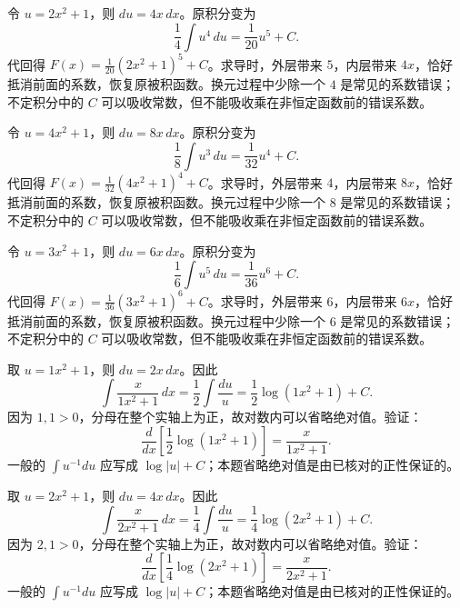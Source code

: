 \documentclass[UTF8,12pt,a4paper,fontset=fandol]{ctexart}
\begin{document}
\begin{solve}\label{ans:c12q4}
令 $u=2x^2+1$，则 $du=4x\,dx$。原积分变为
\[
\frac1{4}\int u^{4}\,du=\frac{1}{20}u^{5}+C.
\]
代回得 $F(x)=\frac{1}{20}(2x^2+1)^{5}+C$。求导时，外层带来 $5$，内层带来 $4x$，恰好抵消前面的系数，恢复原被积函数。换元过程中少除一个 $4$ 是常见的系数错误；不定积分中的 $C$ 可以吸收常数，但不能吸收乘在非恒定函数前的错误系数。
\end{solve}

\begin{solve}\label{ans:c12q5}
令 $u=4x^2+1$，则 $du=8x\,dx$。原积分变为
\[
\frac1{8}\int u^{3}\,du=\frac{1}{32}u^{4}+C.
\]
代回得 $F(x)=\frac{1}{32}(4x^2+1)^{4}+C$。求导时，外层带来 $4$，内层带来 $8x$，恰好抵消前面的系数，恢复原被积函数。换元过程中少除一个 $8$ 是常见的系数错误；不定积分中的 $C$ 可以吸收常数，但不能吸收乘在非恒定函数前的错误系数。
\end{solve}

\begin{solve}\label{ans:c12q6}
令 $u=3x^2+1$，则 $du=6x\,dx$。原积分变为
\[
\frac1{6}\int u^{5}\,du=\frac{1}{36}u^{6}+C.
\]
代回得 $F(x)=\frac{1}{36}(3x^2+1)^{6}+C$。求导时，外层带来 $6$，内层带来 $6x$，恰好抵消前面的系数，恢复原被积函数。换元过程中少除一个 $6$ 是常见的系数错误；不定积分中的 $C$ 可以吸收常数，但不能吸收乘在非恒定函数前的错误系数。
\end{solve}

\begin{solve}\label{ans:c12q7}
取 $u=1x^2+1$，则 $du=2x\,dx$。因此
\[
\int\frac{x}{1x^2+1}\,dx=\frac{1}{2}\int\frac{du}u=\frac{1}{2}\log(1x^2+1)+C.
\]
因为 $1,1>0$，分母在整个实轴上为正，故对数内可以省略绝对值。验证：
\[
\frac d{dx}\left[\frac{1}{2}\log(1x^2+1)\right]=\frac{x}{1x^2+1}.
\]
一般的 $\int u^{-1}du$ 应写成 $\log|u|+C$；本题省略绝对值是由已核对的正性保证的。
\end{solve}

\begin{solve}\label{ans:c12q8}
取 $u=2x^2+1$，则 $du=4x\,dx$。因此
\[
\int\frac{x}{2x^2+1}\,dx=\frac{1}{4}\int\frac{du}u=\frac{1}{4}\log(2x^2+1)+C.
\]
因为 $2,1>0$，分母在整个实轴上为正，故对数内可以省略绝对值。验证：
\[
\frac d{dx}\left[\frac{1}{4}\log(2x^2+1)\right]=\frac{x}{2x^2+1}.
\]
一般的 $\int u^{-1}du$ 应写成 $\log|u|+C$；本题省略绝对值是由已核对的正性保证的。
\end{solve}
\end{document}
